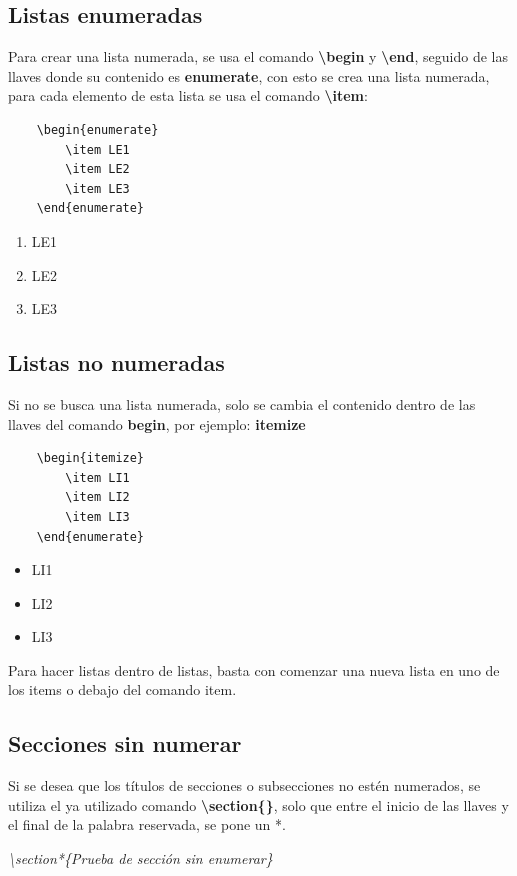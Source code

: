 \subsection{Listas enumeradas}
\hspace{0.55cm}Para crear una lista numerada, se usa el comando \textbf{\textbackslash{begin}} y \textbf{\textbackslash{end}}, seguido de las llaves donde su contenido es \textbf{enumerate}, con esto se crea una lista numerada, para cada elemento de esta lista se usa el comando \textbf{\textbackslash{item}}:
\begin{lstlisting}
    \begin{enumerate}
        \item LE1
        \item LE2
        \item LE3
    \end{enumerate}
\end{lstlisting}
\begin{enumerate}
    \item LE1
    \item LE2
    \item LE3
\end{enumerate}


\subsection{Listas no numeradas}
\hspace{0.55cm}Si no se busca una lista numerada, solo se cambia el contenido dentro de las llaves del comando \textbf{begin}, por ejemplo: \textbf{itemize}
\begin{lstlisting}
    \begin{itemize}
        \item LI1
        \item LI2
        \item LI3
    \end{enumerate}
\end{lstlisting}
\begin{itemize}
    \item LI1
    \item LI2
    \item LI3
\end{itemize}

Para hacer listas dentro de listas, basta con comenzar una nueva lista en uno de los items o debajo del comando item.


\subsection{Secciones sin numerar}
\hspace{0.55cm}Si se desea que los títulos de secciones o subsecciones no estén numerados, se utiliza el ya utilizado comando \textbf{\textbackslash{section}\{\}}, solo que entre el inicio de las llaves y el final de la palabra reservada, se pone un *.
\begin{center}
    \textit{\textbackslash{section*\{Prueba de sección sin enumerar\}}}
\end{center}

